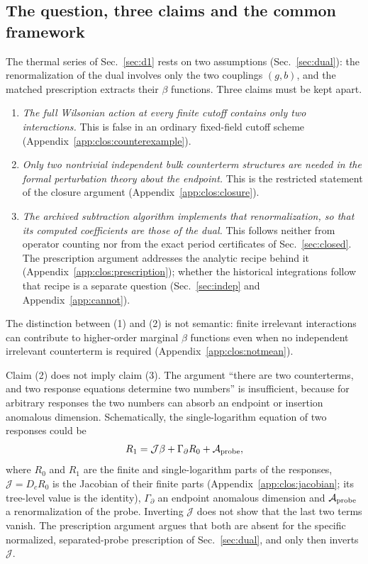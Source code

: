 \documentclass[11pt,a4paper]{article}
\numberwithin{equation}{section}
\begin{document}
\subsection{The question, three claims and the common framework}\label{app:clos:question}
The thermal series of Sec.~\ref{sec:d1} rests on two assumptions (Sec.~\ref{sec:dual}): the renormalization of the dual
involves only the two couplings $(g,b)$, and the matched prescription extracts their $\beta$ functions. Three claims
must be kept apart.
\begin{enumerate}[label=(\arabic*),leftmargin=2em]
\item \emph{The full Wilsonian action at every finite cutoff contains only two interactions.} This is false in an
 ordinary fixed-field cutoff scheme (Appendix~\ref{app:clos:counterexample}).
\item \emph{Only two nontrivial independent bulk counterterm structures are needed in the formal perturbation theory
 about the endpoint.} This is the restricted statement of the closure argument (Appendix~\ref{app:clos:closure}).
\item \emph{The archived subtraction algorithm implements that renormalization, so that its computed coefficients are
 those of the dual.} This follows neither from operator counting nor from the exact period certificates of
 Sec.~\ref{sec:closed}. The prescription argument addresses the analytic recipe behind it
 (Appendix~\ref{app:clos:prescription}); whether the historical integrations follow that recipe is a separate question
 (Sec.~\ref{sec:indep} and Appendix~\ref{app:cannot}).
\end{enumerate}
The distinction between (1) and (2) is not semantic: finite irrelevant interactions can contribute to higher-order
marginal $\beta$ functions even when no independent irrelevant counterterm is required
(Appendix~\ref{app:clos:notmean}).

Claim (2) does not imply claim (3). The argument ``there are two counterterms, and two response equations determine
two numbers'' is insufficient, because for arbitrary responses the two numbers can absorb an endpoint or insertion
anomalous dimension. Schematically, the single-logarithm equation of two responses could be
\begin{equation}
 R_1=\mathcal J\beta+\Gamma_\partial R_0+\mathcal A_{\rm probe},
 \label{eq:clos:anomaly}
\end{equation}
where $R_0$ and $R_1$ are the finite and single-logarithm parts of the responses, $\mathcal J=D_cR_0$ is the
Jacobian of their finite parts (Appendix~\ref{app:clos:jacobian}; its tree-level value is the identity), $\Gamma_\partial$ an endpoint anomalous dimension and $\mathcal A_{\rm probe}$ a renormalization of the
probe. Inverting $\mathcal J$ does not show that the last two terms vanish. The prescription argument argues that both
are absent for the specific normalized, separated-probe prescription of Sec.~\ref{sec:dual}, and only then inverts
$\mathcal J$.
\end{document}
